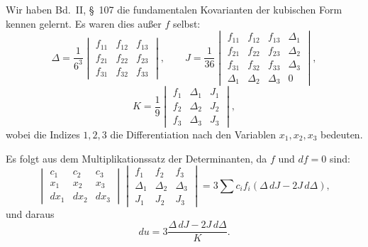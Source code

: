 \documentclass[11pt]{article}
\begin{document}
Wir haben Bd.~II, \S~107 die fundamentalen Kovarianten der kubischen Form kennen gelernt. Es waren dies außer $f$ selbst:
\[
\Delta=\frac1{6^3}\begin{vmatrix}
f_{11}&f_{12}&f_{13}\\
f_{21}&f_{22}&f_{23}\\
f_{31}&f_{32}&f_{33}
\end{vmatrix},\qquad
J=\frac1{36}\begin{vmatrix}
f_{11}&f_{12}&f_{13}&\Delta_1\\
f_{21}&f_{22}&f_{23}&\Delta_2\\
f_{31}&f_{32}&f_{33}&\Delta_3\\
\Delta_1&\Delta_2&\Delta_3&0
\end{vmatrix},
\]
\[
K=\frac19\begin{vmatrix}
f_1&\Delta_1&J_1\\
f_2&\Delta_2&J_2\\
f_3&\Delta_3&J_3
\end{vmatrix},
\]
wobei die Indizes $1,2,3$ die Differentiation nach den Variablen $x_1,x_2,x_3$ bedeuten.

Es folgt aus dem Multiplikationssatz der Determinanten, da $f$ und $df=0$ sind:
\[
\begin{vmatrix}
c_1&c_2&c_3\\
x_1&x_2&x_3\\
dx_1&dx_2&dx_3
\end{vmatrix}
\begin{vmatrix}
f_1&f_2&f_3\\
\Delta_1&\Delta_2&\Delta_3\\
J_1&J_2&J_3
\end{vmatrix}
=3\sum c_if_i(\Delta\,dJ-2J\,d\Delta),
\]
und daraus
\begin{equation}
du=3\frac{\Delta\,dJ-2J\,d\Delta}{K}.
\tag{7}
\end{equation}
\end{document}
